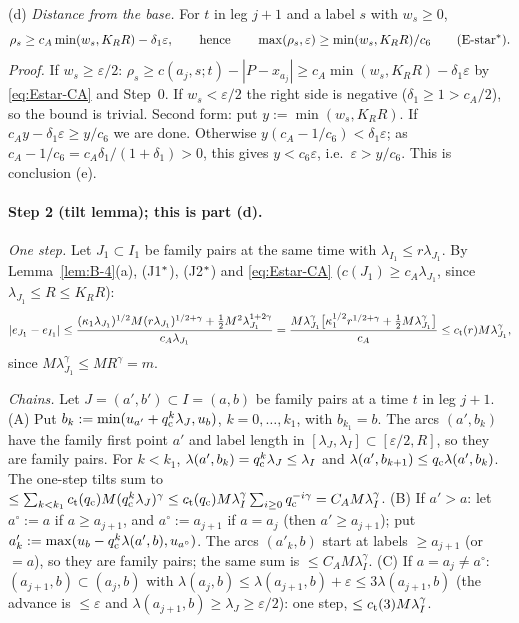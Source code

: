 (d) \emph{Distance from the base.} For $t$ in leg $j+1$ and a label $s$ with $w_s\ge0$,
\begin{equation}\label{eq:Estar-star}
\rho_s\ge c_A\min(w_s,K_RR)-\delta_1\varepsilon,\qquad\text{hence}\qquad\max(\rho_s,\varepsilon)\ge\min(w_s,K_RR)/c_6
\qquad\text{(E-star$^{*}$)}.
\end{equation}
\emph{Proof.} If $w_s\ge\varepsilon/2$: $\rho_s\ge c(a_j,s;t)-|P-x_{a_j}|\ge c_A\min(w_s,K_RR)-\delta_1\varepsilon$ by
\eqref{eq:Estar-CA} and Step~0. If $w_s<\varepsilon/2$ the right side is negative ($\delta_1\ge1>c_A/2$), so the bound is trivial.
Second form: put $y:=\min(w_s,K_RR)$. If $c_Ay-\delta_1\varepsilon\ge y/c_6$ we are done. Otherwise $y(c_A-1/c_6)<\delta_1\varepsilon$;
as $c_A-1/c_6=c_A\delta_1/(1+\delta_1)>0$, this gives $y<c_6\varepsilon$, i.e.\ $\varepsilon>y/c_6$. This is conclusion (e).

\paragraph{Step 2 (tilt lemma); this is part (d).}
\emph{One step.} Let $J_1\subset I_1$ be family pairs at the same time with $\lambda_{I_1}\le r\lambda_{J_1}$. By
Lemma~\ref{lem:B-4}(a), (J1$^{*}$), (J2$^{*}$) and \eqref{eq:Estar-CA} ($c(J_1)\ge c_A\lambda_{J_1}$, since $\lambda_{J_1}\le R\le K_RR$):
\[
|e_{J_1}-e_{I_1}|\le\frac{(\kappa_1\lambda_{J_1})^{1/2}M(r\lambda_{J_1})^{1/2+\gamma}+\frac12M^2\lambda_{J_1}^{1+2\gamma}}{c_A\lambda_{J_1}}
=\frac{M\lambda_{J_1}^\gamma\bigl[\kappa_1^{1/2}r^{1/2+\gamma}+\frac12M\lambda_{J_1}^\gamma\bigr]}{c_A}\le c_{\mathrm t}(r)M\lambda_{J_1}^\gamma,
\]
since $M\lambda_{J_1}^\gamma\le MR^\gamma=m$.

\emph{Chains.} Let $J=(a',b')\subset I=(a,b)$ be family pairs at a time $t$ in leg $j+1$.
(A) Put $b_k:=\min(u_{a'}+q_{\mathrm c}^k\lambda_J,u_b)$, $k=0,\dots,k_1$, with $b_{k_1}=b$. The arcs $(a',b_k)$ have the family first point
$a'$ and label length in $[\lambda_J,\lambda_I]\subset[\varepsilon/2,R]$, so they are family pairs. For $k<k_1$,
$\lambda(a',b_k)=q_{\mathrm c}^k\lambda_J\le\lambda_I$ and $\lambda(a',b_{k+1})\le q_{\mathrm c}\lambda(a',b_k)$. The one-step tilts sum to
$\le\sum_{k<k_1}c_{\mathrm t}(q_{\mathrm c})M(q_{\mathrm c}^k\lambda_J)^\gamma\le c_{\mathrm t}(q_{\mathrm c})M\lambda_I^\gamma\sum_{i\ge0}q_{\mathrm c}^{-i\gamma}=C_AM\lambda_I^\gamma$.
(B) If $a'>a$: let $a^\circ:=a$ if $a\ge a_{j+1}$, and $a^\circ:=a_{j+1}$ if $a=a_j$ (then $a'\ge a_{j+1}$); put
$a'_k:=\max(u_b-q_{\mathrm c}^k\lambda(a',b),u_{a^\circ})$. The arcs $(a'_k,b)$ start at labels $\ge a_{j+1}$ (or $=a$), so they are family
pairs; the same sum is $\le C_AM\lambda_I^\gamma$.
(C) If $a=a_j\ne a^\circ$: $(a_{j+1},b)\subset(a_j,b)$ with $\lambda(a_j,b)\le\lambda(a_{j+1},b)+\varepsilon\le3\lambda(a_{j+1},b)$
(the advance is $\le\varepsilon$ and $\lambda(a_{j+1},b)\ge\lambda_J\ge\varepsilon/2$): one step, $\le c_{\mathrm t}(3)M\lambda_I^\gamma$.

